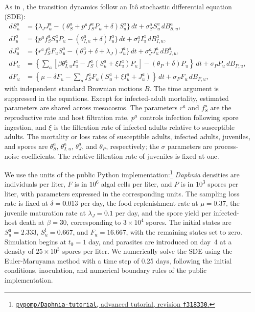 \documentclass[11pt]{article}
\theoremstyle{thmstylethree}%
\begin{document}
As in \citet{yang25daphnia}, the transition dynamics follow an It\^o stochastic differential equation (SDE):
\begin{align*}
dS_u^a
 &= \{\lambda_J J_u^a-(\theta_S^a+p^a f_S^aP_u+\delta)S_u^a\}\,dt
    +\sigma_S^a S_u^a\,dB_{S,u}^a,\\
dI_u^a
 &= \{p^a f_S^a S_u^aP_u-(\theta_{I,u}^a+\delta)I_u^a\}\,dt
    +\sigma_I^a I_u^a\,dB_{I,u}^a,\\
dJ_u^a
 &= \{r^a f_S^aF_uS_u^a-(\theta_J^a+\delta+\lambda_J)J_u^a\}\,dt
    +\sigma_J^a J_u^a\,dB_{J,u}^a,\\
dP_u
 &= \left\{\sum_a\left[\beta\theta_{I,u}^a I_u^a
          -f_S^a(S_u^a+\xi I_u^a)P_u\right]
          -(\theta_P+\delta)P_u\right\}\,dt
    +\sigma_P P_u\,dB_{P,u},\\
dF_u
 &= \left\{\mu-\delta F_u
          -\sum_a f_S^aF_u(S_u^a+\xi I_u^a+J_u^a)\right\}\,dt
    +\sigma_F F_u\,dB_{F,u},
\end{align*}
with independent standard Brownian motions $B$.
The time argument is suppressed in the equations.
Except for infected-adult mortality, estimated parameters are shared across mesocosms.
The parameters $r^a$ and $f_S^a$ are the reproductive rate and host filtration rate, $p^a$ controls infection following spore ingestion, and $\xi$ is the filtration rate of infected adults relative to susceptible adults.
The mortality or loss rates of susceptible adults, infected adults, juveniles, and spores are $\theta_S^a$, $\theta_{I,u}^a$, $\theta_J^a$, and $\theta_P$, respectively; the $\sigma$ parameters are process-noise coefficients.
The relative filtration rate of juveniles is fixed at one.

We use the units of the public Python implementation:\footnote{\href{https://github.com/pypomp/Daphnia-tutorial/blob/f3183301273a409e5b079bb0ae3a22246f69ba7a/Python-code/daphnia_tut_pypomp_advanced.qmd}{\texttt{pypomp/Daphnia-tutorial}, advanced tutorial, revision \texttt{f318330}.}}
\textit{Daphnia} densities are individuals per liter, $F$ is in $10^6$ algal cells per liter, and $P$ is in $10^3$ spores per liter, with parameters expressed in the corresponding units.
The sampling loss rate is fixed at $\delta=0.013$ per day, the food replenishment rate at $\mu=0.37$, the juvenile maturation rate at $\lambda_J=0.1$ per day, and the spore yield per infected-host death at $\beta=30$, corresponding to $3\times10^4$ spores.
The initial states are $S_u^{\mathrm n}=2.333$, $S_u^{\mathrm i}=0.667$, and $F_u=16.667$, with the remaining states set to zero.
Simulation begins at $t_0=1$ day, and parasites are introduced on day~4 at a density of $25\times10^3$ spores per liter.
We numerically solve the SDE using the Euler-Maruyama method with a time step of 0.25 days, following the initial conditions, inoculation, and numerical boundary rules of the public implementation.
\end{document}

